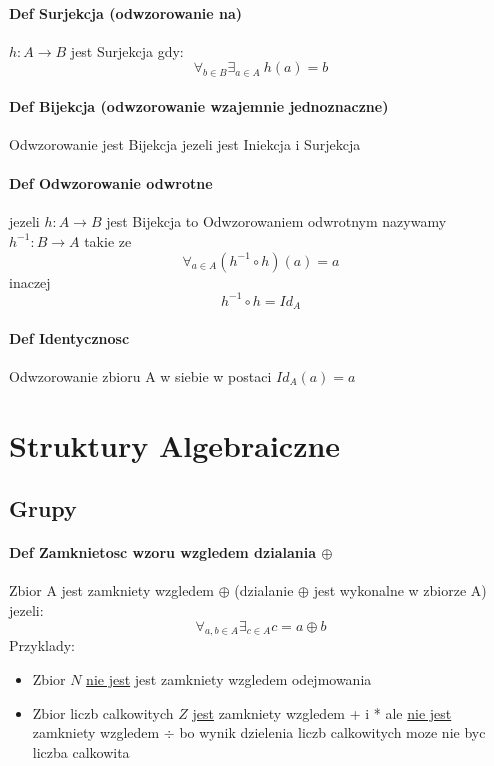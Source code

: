 \documentclass[a4paper]{article}
\begin{document}
\paragraph{Def Surjekcja (odwzorowanie na)}
$ h:A \rightarrow B $ jest Surjekcja gdy:
\begin{equation}
    \forall_{b \in B} \exists_{a \in A } \ h(a) = b
\end{equation}
\paragraph{Def Bijekcja (odwzorowanie wzajemnie jednoznaczne)}
Odwzorowanie jest Bijekcja jezeli jest Iniekcja i Surjekcja
\paragraph{Def Odwzorowanie odwrotne}
jezeli $ h:A \rightarrow B $ jest Bijekcja to Odwzorowaniem odwrotnym nazywamy $ h^{-1}:B \rightarrow A $ takie ze
\begin{equation}
\forall_{a \in A} (h^{-1} \circ h)(a) = a
\end{equation}
inaczej
\begin{equation}
    h^{-1} \circ h = Id_A
\end{equation}
\paragraph{Def Identycznosc}
Odwzorowanie zbioru A w siebie w postaci $ Id_A(a) =a $
\section{Struktury Algebraiczne}
\subsection{Grupy}
\paragraph{Def Zamknietosc wzoru wzgledem dzialania $ \oplus $}
Zbior A jest zamkniety wzgledem $ \oplus $ (dzialanie $\oplus$ jest wykonalne w zbiorze A) jezeli:
\begin{equation}
    \forall_{a,b \in A} \exists_{c \in A} c = a \oplus b
\end{equation}
Przyklady:
\begin{itemize}
    \item Zbior $N$  \underline{nie jest} jest zamkniety wzgledem odejmowania
    \item Zbior liczb calkowitych $Z$ \underline{jest} zamkniety wzgledem  + i * ale \underline{nie jest} zamkniety wzgledem $\div$ bo wynik dzielenia liczb calkowitych moze nie byc liczba calkowita
\end{itemize}
\end{document}
